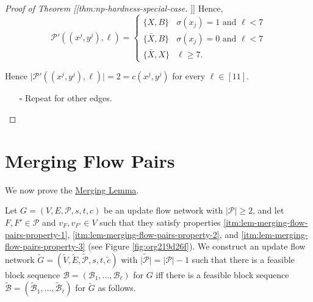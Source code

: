 \documentclass[fontsize=11pt,paper=a4]{book}
\begin{document}
\begin{proof}[Proof of Theorem [[thm:np-hardness-special-case]]]
Hence,
\[\mathcal{P}'((x^j,y^j),\ell)=
\begin{cases}
\{X,B\} & \sigma(x_j)=1\text{ and }\ell<7\\
\{\bar{X},B\} & \sigma(x_j)=0\text{ and }\ell<7\\
\{\bar{X},X\} & \ell\geq 7.
\end{cases}\]

Hence \(\lvert\mathcal{P}'((x^j,y^j),\ell)\rvert=2=c(x^j,y^j)\) for every \(\ell\in[11]\).

\begin{itemize}
\item[{$\square$}] Repeat for other edges.
\end{itemize}
\end{proof}

\chapter{Merging Flow Pairs}
\label{sec:orge02f147}

We now prove the \hyperref[org859ddb4]{Merging Lemma}.

Let \(G=(V,E,\mathcal{P},s,t,c)\) be an update flow network with \(\lvert\mathcal{P}\rvert\geq 2\), and let \(F,F'\in\mathcal{P}\) and \(v_F,v_{F'}\in V\) such that they satisfy properties \ref{itm:lem-merging-flow-pairs-property-1}, \ref{itm:lem-merging-flow-pairs-property-2}, and \ref{itm:lem-merging-flow-pairs-property-3} (see Figure \ref{fig:org219d26f}).
We construct an update flow network \(\tilde{G}=(\tilde{V},\tilde{E},\tilde{\mathcal{P}},s,t,\tilde{c})\) with \(\lvert\tilde{\mathcal{P}}\rvert=\lvert\mathcal{P}\rvert-1\) such that there is a feasible block sequence \(\mathcal{B}=(\mathscr{B}_1,\dots,\mathscr{B}_{\ell})\) for \(G\) iff there is a feasible block sequence \(\tilde{\mathcal{B}}=(\tilde{\mathscr{B}}_1,\dots,\tilde{\mathscr{B}}_{\ell})\) for \(\tilde{G}\) as follows.
\end{document}

